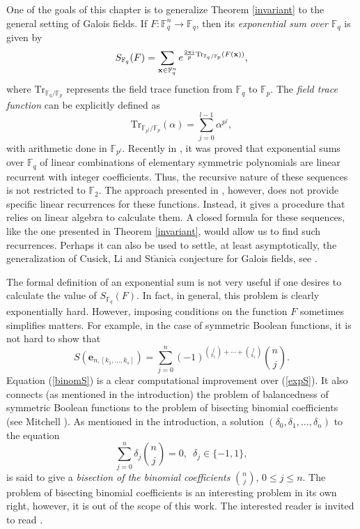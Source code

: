One of the goals of this chapter is to generalize Theorem \ref{invariant} to the general setting of Galois fields.  
If $F:\mathbb{F}_q^n\to \mathbb{F}_q$, then its {\it exponential sum over $\mathbb{F}_q$} is given by 
\begin{equation}
\label{expSq}
 S_{\mathbb{F}_q}(F)=\sum_{{\bf x}\in \mathbb{F}^n_q} e^{\frac{2\pi i}{p} \text{Tr}_{\mathbb{F}_q/\mathbb{F}_p}(F({\bf x}))},
\end{equation}
where $\text{Tr}_{\mathbb{F}_q/\mathbb{F}_p}$ represents the field trace function from $\mathbb{F}_q$ to $\mathbb{F}_p$. The {\it field trace function} can be explicitly defined as
\begin{equation}
 \text{Tr}_{\mathbb{F}_{p^l}/\mathbb{F}_p}(\alpha)=\sum _{j=0}^{l-1} \alpha ^{p^j},
\end{equation}
with arithmetic done in $\mathbb{F}_{p^l}$.  Recently in \cite{ccms}, it was proved that exponential sums over $\mathbb{F}_q$ of linear
combinations of elementary symmetric polynomials are linear recurrent with integer coefficients. Thus, the recursive nature of these sequences is not restricted to $\mathbb{F}_2$. The approach presented in \cite{ccms},
however, does not provide specific linear recurrences for these functions.  Instead, it gives a procedure that relies on linear algebra to calculate them.  A closed formula for these sequences, like the one presented in 
Theorem \ref{invariant}, would allow us to find such recurrences.  Perhaps it can also be used to settle, at least asymptotically, the generalization of Cusick, Li and St$\check{\mbox{a}}$nic$\check{\mbox{a}}$
conjecture for Galois fields, see \cite{acgmr}.


The formal definition of an exponential sum is not very useful if one desires to calculate the value of $S_{\mathbb{F}_q}(F)$.  In fact, in general, this problem is clearly exponentially hard.  
However, imposing conditions on the function $F$ sometimes simplifies matters.  For example, in the case of symmetric Boolean functions, it is not hard to show that
\begin{equation}
\label{binomS}
 S(\boldsymbol{e}_{n,[k_1,\ldots,k_s]}) = \sum_{j=0}^n (-1)^{\binom{j}{k_1}+\cdots+\binom{j}{k_s}} \binom{n}{j}.
\end{equation}
Equation (\ref{binomS}) is a clear computational improvement over (\ref{expS}).   It also connects (as mentioned in the introduction) the problem of balancedness of symmetric Boolean functions to the problem of 
bisecting binomial coefficients (see Mitchell \cite{mitchell}).   As mentioned in the introduction, a solution $(\delta_0,\delta_1,\ldots, \delta_n)$ to the equation
\begin{equation}
\label{bisec}
 \sum_{j=0}^n \delta_j \binom{n}{j}=0,\,\,\, \delta_j \in \{-1,1\},
\end{equation}
is said to give a {\em bisection of the binomial coefficients} $\binom{n}{j}$, $0\leq j \leq n.$  
The problem of bisecting binomial coefficients is an interesting problem in its own right, however, it is out of the scope of this work.  The interested reader is invited to read \cite{ims,mitchell}.

